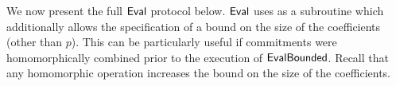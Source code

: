 \documentclass{article}
\theoremstyle{definition}
\begin{document}
We now present the full $\textsf{{Eval}}$ protocol below. $\textsf{{Eval}}$ uses as a subroutine  which additionally allows the specification of a bound on the size of the coefficients (other than $p$).  This can be particularly useful if commitments were homomorphically combined prior to the execution of $\textsf{{EvalBounded}}$. Recall that any homomorphic operation increases the bound on the size of the coefficients.

\end{document}
